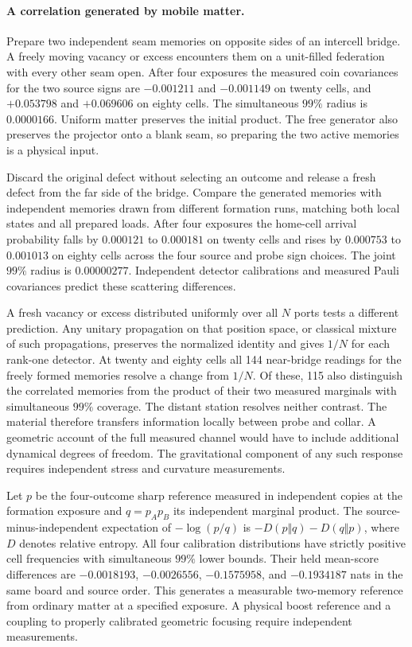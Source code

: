\documentclass[11pt]{article}
\begin{document}
\paragraph{A correlation generated by mobile matter.}
Prepare two independent seam memories on opposite sides of an intercell
bridge. A freely moving vacancy or excess encounters them on a unit-filled
federation with every other seam open. After four exposures the measured
coin covariances for the two source signs are $-0.001211$ and $-0.001149$
on twenty cells, and $+0.053798$ and $+0.069606$ on eighty cells.
The simultaneous $99\%$ radius is $0.0000166$. Uniform matter preserves the
initial product. The free generator also preserves the projector onto a
blank seam, so preparing the two active memories is a physical input.

Discard the original defect without selecting an outcome and release a
fresh defect from the far side of the bridge. Compare the generated
memories with independent memories drawn from different formation runs,
matching both local states and all prepared loads. After four exposures
the home-cell arrival probability falls by $0.000121$ to $0.000181$ on
twenty cells and rises by $0.000753$ to $0.001013$ on eighty cells across
the four source and probe sign choices. The joint $99\%$ radius is
$0.00000277$. Independent detector calibrations and measured Pauli
covariances predict these scattering differences.

A fresh vacancy or excess distributed uniformly over all $N$ ports tests a
different prediction. Any unitary propagation on that position space, or
classical mixture of such propagations, preserves the normalized identity
and gives $1/N$ for each rank-one detector. At twenty and eighty cells all
144 near-bridge readings for the freely formed memories resolve a change
from $1/N$. Of these, 115 also distinguish the correlated memories from
the product of their two measured marginals with simultaneous $99\%$
coverage. The distant station resolves neither contrast. The material
therefore transfers information locally between probe and collar. A
geometric account of the full measured channel would have to include
additional dynamical degrees of freedom. The gravitational component of
any such response requires independent stress and curvature measurements.

Let $p$ be the four-outcome sharp reference measured in independent copies
at the formation exposure and $q=p_Ap_B$ its independent marginal product.
The source-minus-independent expectation of $-\log(p/q)$ is
$-D(p\Vert q)-D(q\Vert p)$, where $D$ denotes relative entropy.
All four calibration distributions have strictly positive cell frequencies
with simultaneous $99\%$ lower bounds. Their held mean-score differences
are $-0.0018193$, $-0.0026556$, $-0.1575958$, and $-0.1934187$ nats
in the same board and source order. This generates a measurable
two-memory reference from ordinary matter at a specified exposure.
A physical boost reference and a coupling to properly calibrated
geometric focusing require independent measurements.
\end{document}
